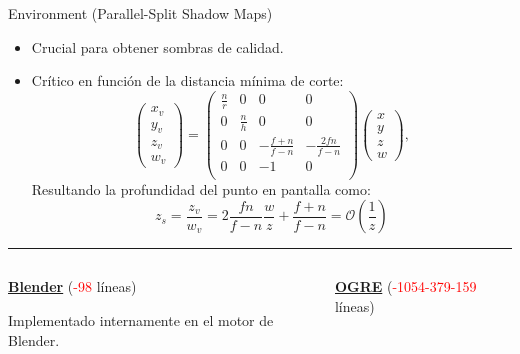\begin{frame}{Environment (Parallel-Split Shadow Maps)}
%
\begin{itemize}
	\item Crucial para obtener sombras de calidad.
	\item Crítico en función de la distancia mínima de corte:
	\[
	\left( \begin{matrix} x_v \\ y_v \\ z_v \\ w_v \end{matrix} \right)	
	=
	\left( \begin{matrix} 
		\frac{n}{r} & 0           & 0                & 0                  \\
		0           & \frac{n}{h} & 0                & 0                  \\
		0           & 0           & -\frac{f+n}{f-n} & -\frac{2 f n}{f-n} \\
		0           & 0           & -1               & 0                  \\
	\end{matrix} \right)	
	\left( \begin{matrix} x \\ y \\ z \\ w \end{matrix} \right)	
	,
	\]
	Resultando la profundidad del punto en pantalla como:
	\[ z_s = \frac{z_v}{w_v} = 2 \frac{f n}{f - n} \frac{w}{z} + \frac{f + n}{f - n}
	= \mathcal{O}\left( \frac{1}{z} \right) \]
\end{itemize}
\pause
\hrule
\vspace{0.2cm}
%
\begin{columns}
  \begin{column}{0.5\textwidth}
    \textbf{\underline{Blender}} (\textcolor{red}{-98} líneas)
    
    \vspace{1.2cm}
    Implementado internamente en el motor de Blender.
  \end{column}

  \begin{column}{0.5\textwidth}
    \textbf{\underline{OGRE}} (\textcolor{red}{-1054-379-159} líneas)
        
    \vspace{0.5cm}
  \end{column}
\end{columns}
\end{frame}

